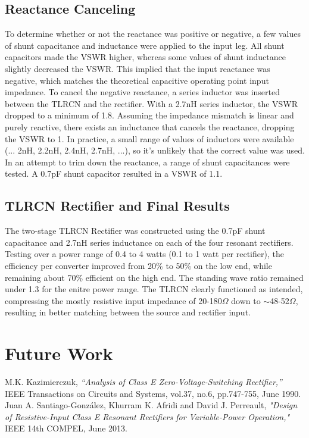 \documentclass[11pt, a4paper]{article}
\begin{document}
\subsection{Reactance Canceling}
To determine whether or not the reactance was positive or negative, a few values of shunt capacitance and inductance were applied to the input leg.  
All shunt capacitors made the VSWR higher, whereas some values of shunt inductance slightly decreased the VSWR.  
This implied that the input reactance was negative, which matches the theoretical capacitive operating point input impedance.  
To cancel the negative reactance, a series inductor was inserted between the TLRCN and the rectifier.  
With a 2.7nH series inductor, the VSWR dropped to a minimum of 1.8. 
Assuming the impedance mismatch is linear and purely reactive, there exists an inductance that cancels the reactance, dropping the VSWR to 1.
In practice, a small range of values of inductors were available (... 2nH, 2.2nH, 2.4nH, 2.7nH, ...), so it's unlikely that the correct value was used.  
In an attempt to trim down the reactance, a range of shunt capacitances were tested.  
A 0.7pF shunt capacitor resulted in a VSWR of 1.1.

\subsection{TLRCN Rectifier and Final Results}

The two-stage TLRCN Rectifier was constructed using the 0.7pF shunt capacitance and 2.7nH series inductance on each of the four resonant rectifiers.  
Testing over a power range of 0.4 to 4 watts (0.1 to 1 watt per rectifier), the efficiency per converter improved from 20\% to 50\% on the low end, while remaining about 70\% efficient on the high end.  
The standing wave ratio remained under 1.3 for the enitre power range.
The TLRCN clearly functioned as intended, compressing the mostly resistive input impedance of 20-180$\Omega$ down to $\sim$48-52$\Omega$, resulting in better matching between the source and rectifier input.

\section{Future Work}


\begin{thebibliography}{1}
 M.K. Kazimierczuk, {\em “Analysis of Class E Zero-Voltage-Switching Rectifier,”} IEEE Transactions on Circuits and Systems, vol.37, no.6, pp.747-755, June 1990. \\
 Juan A. Santiago-González, Khurram K. Afridi and David J. Perreault, {\em "Design of Resistive-Input Class E Resonant Rectifiers for Variable-Power Operation,"} IEEE 14th COMPEL, June 2013. \\
\end{thebibliography}
\end{document}
